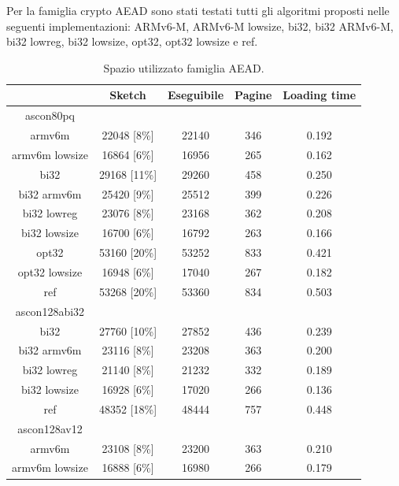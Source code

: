 \documentclass[12pt,a4paper,italian]{report}
\begin{document}
Per la famiglia crypto AEAD sono stati testati tutti gli algoritmi proposti nelle seguenti implementazioni: ARMv6-M, ARMv6-M lowsize, bi32, bi32 ARMv6-M, bi32 lowreg, bi32 lowsize, opt32, opt32 lowsize e ref.

\begin{table}[h]
    \caption{Spazio utilizzato famiglia AEAD.}
    \centering
	\begin{tabular}{|c|c|c|c|c|}
		\hline
         & Sketch & Eseguibile & Pagine & Loading time \\
        \hline
        ascon80pq & & & & \\
        \hline
        armv6m & 22048 [8\%] & 22140 & 346 & 0.192 \\
        \hline
        armv6m lowsize & 16864 [6\%] & 16956 & 265 & 0.162 \\
        \hline
        bi32 & 29168 [11\%] & 29260 & 458 & 0.250 \\
        \hline
        bi32 armv6m & 25420 [9\%] & 25512 & 399 & 0.226 \\
        \hline
        bi32 lowreg & 23076 [8\%] & 23168 & 362 & 0.208 \\
        \hline
        bi32 lowsize & 16700 [6\%] & 16792 & 263 & 0.166 \\
        \hline
        opt32 & 53160 [20\%] & 53252 & 833 & 0.421 \\
        \hline
        opt32 lowsize & 16948 [6\%] & 17040 & 267 & 0.182 \\
        \hline
        ref & 53268 [20\%] & 53360 & 834 & 0.503 \\
        \hline
        ascon128abi32 & & & & \\
        \hline  
        bi32 & 27760 [10\%] & 27852 & 436 & 0.239 \\
        \hline
        bi32 armv6m & 23116 [8\%] & 23208 & 363 & 0.200 \\
        \hline
        bi32 lowreg & 21140 [8\%] & 21232 & 332 & 0.189 \\
        \hline
        bi32 lowsize & 16928 [6\%] & 17020 & 266 & 0.136 \\
        \hline
        ref & 48352 [18\%] & 48444 & 757 & 0.448 \\
        \hline
        ascon128av12 & & & & \\
        \hline
        armv6m & 23108 [8\%] & 23200 & 363 & 0.210 \\
        \hline
        armv6m lowsize & 16888 [6\%] & 16980 & 266 & 0.179 \\

\end{tabular}
\end{table}
\end{document}
